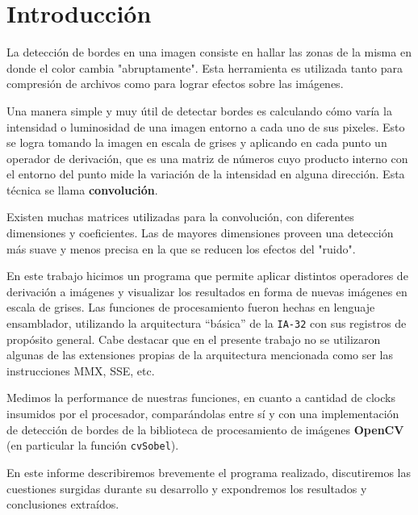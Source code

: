 \section{Introducción}

La detección de bordes en una imagen consiste en hallar las zonas de la misma en donde el color cambia "abruptamente". Esta herramienta es utilizada tanto para compresión de archivos como para lograr efectos sobre las imágenes.


Una manera simple y muy útil de detectar bordes es calculando cómo varía la intensidad o luminosidad de una imagen entorno a cada uno de sus pixeles. Esto se logra tomando la imagen en escala de grises y aplicando en cada punto un operador de derivación, que es una matriz de números cuyo producto interno con el entorno del punto mide la variación de la intensidad en alguna dirección. Esta técnica se llama \textbf{convolución}.

Existen muchas matrices utilizadas para la convolución, con diferentes dimensiones y coeficientes. Las de mayores dimensiones proveen una detección más suave y menos precisa en la que se reducen los efectos del "ruido".


En este trabajo hicimos un programa que permite aplicar distintos operadores de derivación a imágenes y visualizar los resultados en forma de nuevas imágenes en escala de grises. Las funciones de procesamiento fueron hechas en lenguaje ensamblador, utilizando la arquitectura ``básica'' de la \texttt{IA-32} con sus registros de propósito general. Cabe destacar que en el presente trabajo no se utilizaron algunas de las extensiones propias de la arquitectura mencionada como ser las instrucciones MMX, SSE, etc. 

Medimos la performance de nuestras funciones, en cuanto a cantidad de clocks insumidos por el procesador, comparándolas entre sí y con una implementación de detección de bordes de la biblioteca de procesamiento de imágenes \textbf{OpenCV} (en particular la función \texttt{cvSobel}).

En este informe describiremos brevemente el programa realizado, discutiremos las cuestiones surgidas durante su desarrollo y expondremos los resultados y conclusiones extraídos.
